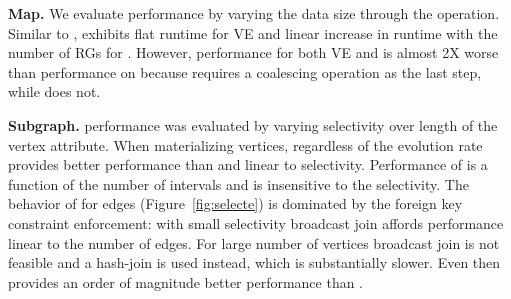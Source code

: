 {\bf Map.}  We evaluate  performance by varying the data
size through the  operation.  Similar to ,
 exhibits flat runtime for VE and linear increase in
runtime with the number of RGs for \sg.  However, performance for both
VE and \sg is almost 2X worse than performance on 
because  requires a coalescing operation as the last step,
while  does not.

{\bf Subgraph.}   performance was evaluated by varying
selectivity over length of the vertex attribute.  When materializing
vertices, regardless of the evolution rate \ve provides better
performance than \sg and linear to selectivity.  Performance of \sg is
a function of the number of intervals and is insensitive to
the selectivity.  The behavior of \ve for edges
(Figure~\ref{fig:selecte}) is dominated by the foreign key constraint
enforcement: with small selectivity broadcast join affords performance
linear to the number of edges.  For large number of vertices broadcast
join is not feasible and a hash-join is used instead, which is
substantially slower.  Even then \ve provides an order of magnitude
better performance than \sg.


